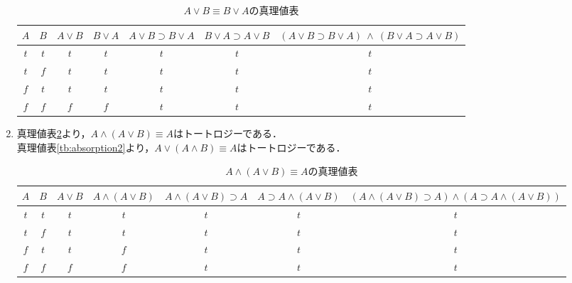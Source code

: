 \documentclass[11pt,dvipdfmx]{jreport}
\begin{document}
\begin{enumerate}
\begin{table}[!htbp]
  \centering
  \caption{$A \lor B \equiv B \lor A$の真理値表}
  \vspace{3mm}
  \begin{tabular}{c|c|c|c|c|c|c}
    $A$ & $B$ & $A \lor B$ & $B \lor A$ & $A \lor B \supset B \lor A$ & $B \lor A \supset A \lor B$ & $(A \lor B \supset B \lor A) \ \land \ (B \lor A \supset A \lor B)$ \\ \hline
    $t$ & $t$ & $t$ & $t$ & $t$ & $t$ & $t$ \\ \hline 
    $t$ & $f$ & $t$ & $t$ & $t$ & $t$ & $t$ \\ \hline
    $f$ & $t$ & $t$ & $t$ & $t$ & $t$ & $t$ \\ \hline 
    $f$ & $f$ & $f$ & $f$ & $t$ & $t$ & $t$
  \end{tabular}
  \label{tb:commutative2}
\end{table}

 \item 真理値表\ref{tb:absorption1}より，$A \land (A \lor B) \equiv A$はトートロジーである．\\ 
  真理値表\ref{tb:absorption2}より，$A \lor (A \land B) \equiv A$はトートロジーである．
\begin{table}[!htbp]
 \centering
 \caption{$A \land (A \lor B) \equiv A$の真理値表}
 \vspace{3mm}
 \begin{tabular}{c|c|c|c|c|c|c}
   $A$ & $B$ & $A \lor B$ & $A \land (A \lor B)$ & $A \land (A \lor B) \supset A$ & $A \supset A \land (A \lor B)$ & $(A \land (A \lor B) \supset A) \land (A \supset A \land (A \lor B)) $ \\ \hline 
   $t$ & $t$ & $t$ & $t$ & $t$ & $t$ & $t$ \\ \hline 
   $t$ & $f$ & $t$ & $t$ & $t$ & $t$ & $t$ \\ \hline
   $f$ & $t$ & $t$ & $f$ & $t$ & $t$ & $t$ \\ \hline 
   $f$ & $f$ & $f$ & $f$ & $t$ & $t$ & $t$
 \end{tabular}
 \label{tb:absorption1}
\end{table}


\end{enumerate}
\end{document}
